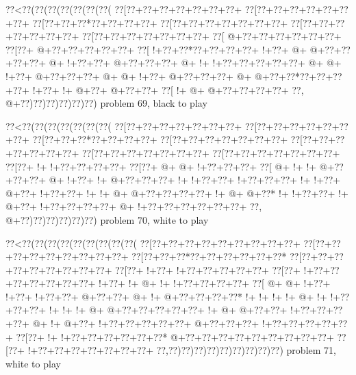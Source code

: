 \vbox{\vbox{\goo
\0??<\0??(\0??(\0??(\0??(\0??(\0??(\0??(
\0??[\0??+\0??+\0??+\0??+\0??+\0??+\0??+
\0??[\0??+\0??+\0??+\0??+\0??+\0??+\0??+
\0??[\0??+\0??+\0??*\0??+\0??+\0??+\0??+
\0??[\0??+\0??+\0??+\0??+\0??+\0??+\0??+
\0??[\0??+\0??+\0??+\0??+\0??+\0??+\0??+
\0??[\0??+\0??+\0??+\0??+\0??+\0??+\0??+
\0??[\- @+\0??+\0??+\0??+\0??+\0??+\0??+
\0??[\0??+\- @+\0??+\0??+\0??+\0??+\0??+
\0??[\- !+\0??+\0??*\0??+\0??+\0??+\0??+
\- !+\0??+\- @+\- @+\0??+\0??+\0??+\0??+
\- @+\- !+\0??+\0??+\- @+\0??+\0??+\0??+
\- @+\- !+\- !+\0??+\0??+\0??+\0??+\0??+
\- @+\- @+\- !+\0??+\- @+\0??+\0??+\0??+
\- @+\- @+\- !+\0??+\- @+\0??+\0??+\0??+
\- @+\- @+\0??+\0??*\0??+\0??+\0??+\0??+
\- !+\0??+\- !+\- @+\0??+\- @+\0??+\0??+
\0??[\- !+\- @+\- @+\0??+\0??+\0??+\0??+
\0??,\- @+\0??)\0??)\0??)\0??)\0??)\0??)
}
\hfil problem 69, black to play\hfil\break
}

\vbox{\vbox{\goo
\0??<\0??(\0??(\0??(\0??(\0??(\0??(\0??(
\0??[\0??+\0??+\0??+\0??+\0??+\0??+\0??+
\0??[\0??+\0??+\0??+\0??+\0??+\0??+\0??+
\0??[\0??+\0??+\0??*\0??+\0??+\0??+\0??+
\0??[\0??+\0??+\0??+\0??+\0??+\0??+\0??+
\0??[\0??+\0??+\0??+\0??+\0??+\0??+\0??+
\0??[\0??+\0??+\0??+\0??+\0??+\0??+\0??+
\0??[\0??+\0??+\0??+\0??+\0??+\0??+\0??+
\0??[\0??+\- !+\- !+\0??+\0??+\0??+\0??+
\0??[\0??+\- @+\- @+\- !+\0??+\0??+\0??+
\0??[\- @+\- !+\- !+\- @+\0??+\0??+\0??+
\- @+\- !+\0??+\- !+\- @+\0??+\0??+\0??+
\- !+\- !+\0??+\0??+\- !+\0??+\0??+\0??+
\- !+\- !+\0??+\- @+\0??+\- !+\0??+\0??+
\- !+\- !+\- @+\- @+\0??+\0??+\0??+\0??+
\- !+\- @+\- @+\0??*\- !+\- !+\0??+\0??+
\- !+\- @+\0??+\- !+\0??+\0??+\0??+\0??+
\- @+\- !+\0??+\0??+\0??+\0??+\0??+\0??+
\0??,\- @+\0??)\0??)\0??)\0??)\0??)\0??)
}
\hfil problem 70, white to play\hfil\break
}

\vbox{\vbox{\goo
\0??<\0??(\0??(\0??(\0??(\0??(\0??(\0??(\0??(\0??(
\0??[\0??+\0??+\0??+\0??+\0??+\0??+\0??+\0??+\0??+
\0??[\0??+\0??+\0??+\0??+\0??+\0??+\0??+\0??+\0??+
\0??[\0??+\0??+\0??*\0??+\0??+\0??+\0??+\0??+\0??*
\0??[\0??+\0??+\0??+\0??+\0??+\0??+\0??+\0??+\0??+
\0??[\0??+\- !+\0??+\- !+\0??+\0??+\0??+\0??+\0??+
\0??[\0??+\- !+\0??+\0??+\0??+\0??+\0??+\0??+\0??+
\- !+\0??+\- !+\- @+\- !+\- !+\0??+\0??+\0??+\0??+
\0??[\- @+\- @+\- !+\0??+\- !+\0??+\- !+\0??+\0??+
\- @+\0??+\0??+\- @+\- !+\- @+\0??+\0??+\0??+\0??*
\- !+\- !+\- !+\- !+\- @+\- !+\- !+\0??+\0??+\0??+
\- !+\- !+\- !+\- @+\- @+\0??+\0??+\0??+\0??+\0??+
\- !+\- @+\- @+\0??+\0??+\- !+\0??+\0??+\0??+\0??+
\- @+\- !+\- @+\0??+\- !+\0??+\0??+\0??+\0??+\0??+
\- @+\0??+\0??+\0??+\- !+\0??+\0??+\0??+\0??+\0??+
\0??[\0??+\- !+\- !+\0??+\0??+\0??+\0??+\0??+\0??*
\- @+\0??+\0??+\0??+\0??+\0??+\0??+\0??+\0??+\0??+
\0??[\0??+\- !+\0??+\0??+\0??+\0??+\0??+\0??+\0??+
\0??,\0??)\0??)\0??)\0??)\0??)\0??)\0??)\0??)\0??)
}
\hfil problem 71, white to play\hfil\break
}

